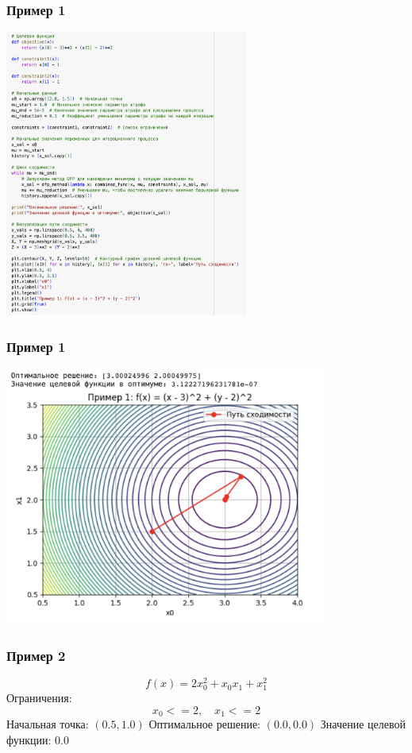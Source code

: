 \documentclass[12pt,pdf,hyperref={unicode}]{beamer}
\begin{document}
\begin{frame}
\frametitle{Пример 1}
\begin{center}
    \includegraphics[width=0.6\textwidth]{image5.png}
\end{center}
\end{frame}

\begin{frame}
\frametitle{Пример 1}
\begin{center}
    \includegraphics[width=0.8\textwidth]{image6.png}
\end{center}
\end{frame}

\begin{frame}
\frametitle{Пример 2}
\[
f(x) = 2x_0^2 + x_0x_1 + x_1^2
\]
Ограничения: \\
\[
x_0 <= 2, \quad x_1 <= 2
\]
Начальная точка: $(0.5, 1.0)$
Оптимальное решение: $(0.0, 0.0)$
Значение целевой функции: $0.0$
\end{frame}
\end{document}
